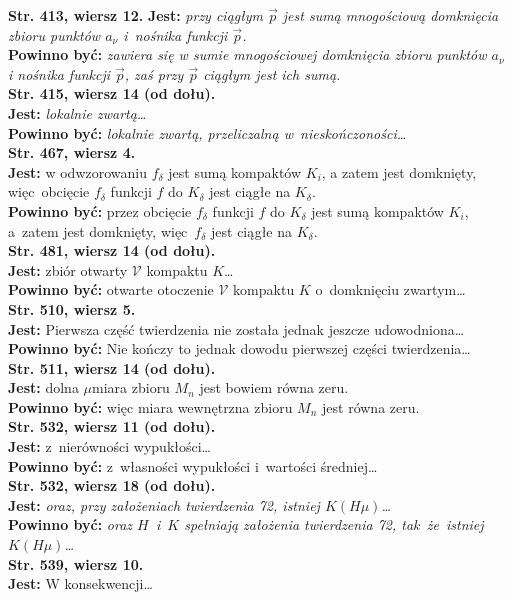 \documentclass[a4paper]{article}
\newcommand{\tb}{\textbf}
\newcommand{\StrWg}[2]{\tb{Str. #1, wiersz #2.}}
\newcommand{\StrWd}[2]{\tb{Str. #1, wiersz #2 (od dołu).}}
\newcommand{\Jest}{\tb{Jest: }}
\newcommand{\Pow}{\tb{Powinno być: }}
\begin{document}
\StrWg{413}{12} \Jest \emph{przy ciągłym $\vec{ p }$ jest sumą
  mnogościową domknięcia
  zbioru punktów $a_{ \nu }$ i~nośnika funkcji $\vec{ p }$.} \\
\Pow \emph{zawiera się w sumie mnogościowej domknięcia zbioru punktów
  $a_{ \nu }$ i nośnika funkcji $\vec{ p }$, zaś przy $\vec{ p }$ ciągłym
  jest ich sumą.} \\
\StrWd{415}{14} \\
\Jest \emph{lokalnie zwartą\ldots} \\
\Pow \emph{lokalnie zwartą, przeliczalną w~nieskończoności\ldots} \\
\StrWg{467}{4} \\
\Jest w odwzorowaniu $f_{ \delta }$ jest sumą kompaktów $K_{ i }$, a zatem jest domknięty, więc~obcięcie $f_{ \delta }$ funkcji $f$ do $K_{ \delta }$ jest ciągłe na $K_{ \delta }$. \\
\Pow przez obcięcie $f_{ \delta }$ funkcji $f$ do $K_{ \delta }$ jest
sumą kompaktów $K_{ i }$, a~zatem jest domknięty, więc~$f_{ \delta }$
jest
ciągłe na $K_{ \delta }$. \\
\StrWd{481}{14} \\
\Jest zbiór otwarty $\mathcal{V}$ kompaktu $K$\ldots \\
\Pow otwarte otoczenie $\mathcal{V}$ kompaktu $K$ o~domknięciu
zwartym\ldots \\
\StrWg{510}{5} \\
\Jest Pierwsza część twierdzenia nie została jednak jeszcze
udowodniona\ldots \\
\Pow Nie kończy to jednak dowodu pierwszej części twierdzenia\ldots \\
\StrWd{511}{14} \\
\Jest dolna $\mu$\dywiz miara zbioru $M_{ n }$ jest bowiem równa zeru. \\
\Pow więc miara wewnętrzna zbioru $M_{ n }$ jest równa zeru. \\
\StrWd{532}{11} \\
\Jest z~nierówności wypukłości\ldots\\
\Pow z~własności wypukłości i~wartości średniej\ldots \\
\StrWd{532}{18} \\
\Jest \emph{oraz, przy założeniach twierdzenia 72, istniej
  $K( H \mu )$\ldots} \\
\Pow \emph{oraz $H$~i~$K$ spełniają założenia twierdzenia 72, tak~że~istniej $K( H \mu )$\ldots}\\
\StrWg{539}{10} \\
\Jest W konsekwencji\ldots \\
\end{document}
